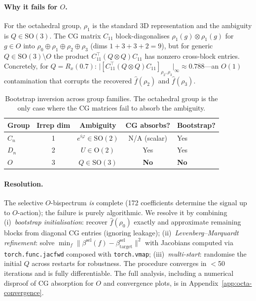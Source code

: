 \documentclass{article}
\newcommand{\SO}{\mathrm{SO}}
\newcommand{\OG}{\mathrm{O}}
\newcommand{\abs}[1]{\lvert #1 \rvert}
\newcommand{\norm}[1]{\lVert #1 \rVert}
\begin{document}
\paragraph{Why it fails for $O$.}
For the octahedral group, $\rho_1$ is the standard 3D representation
and the ambiguity is $Q \in \SO(3)$. The CG matrix $C_{11}$
block-diagonalises $\rho_1(g) \otimes \rho_1(g)$ for $g \in O$ into
$\rho_0 \oplus \rho_1 \oplus \rho_2 \oplus \rho_3$ (dims $1 + 3 + 3 + 2 = 9$),
but for generic $Q \in \SO(3) \setminus O$ the product
$C_{11}^\top (Q \otimes Q) C_{11}$ has nonzero cross-block entries.
Concretely, for $Q = R_x(0.7)$:
$\abs{[C_{11}^\top (Q \otimes Q) C_{11}]_{\rho_2, \rho_3}}_\infty
\approx 0.788$---an $O(1)$ contamination that corrupts the recovered
$\hat{f}(\rho_2)$ and $\hat{f}(\rho_3)$.

\begin{table}[h]
  \caption{Bootstrap inversion across group families. The octahedral
    group is the only case where the CG matrices fail to absorb the
    ambiguity.}
  \label{tab:bootstrap-comparison}
  \centering
  \small
  \begin{tabular}{lcccl}
    \toprule
    Group & Irrep dim & Ambiguity & CG absorbs? & Bootstrap? \\
    \midrule
    $C_n$ & 1 & $e^{i\varphi} \in \SO(2)$ & N/A (scalar) & Yes \\
    $D_n$ & 2 & $U \in \OG(2)$ & Yes & Yes \\
    $O$   & 3 & $Q \in \SO(3)$ & \textbf{No} & \textbf{No} \\
    \bottomrule
  \end{tabular}
\end{table}

\paragraph{Resolution.}
The selective $O$-bispectrum \emph{is} complete (172 coefficients
determine the signal up to $O$-action); the failure is purely
algorithmic. We resolve it by combining
(i)~\emph{bootstrap initialisation}: recover $\hat{f}(\rho_0)$
exactly and approximate remaining blocks from diagonal CG entries
(ignoring leakage);
(ii)~\emph{Levenberg--Marquardt refinement}: solve
$\min_f \norm{\beta^{\mathrm{sel}}(f)
  - \beta^{\mathrm{sel}}_{\mathrm{target}}}^2$
with Jacobians computed via \texttt{torch.func.jacfwd} composed with
\texttt{torch.vmap};
(iii)~\emph{multi-start}: randomise the initial $Q$ across restarts
for robustness. The procedure converges in $<$50 iterations and is
fully differentiable. The full analysis, including a numerical
disproof of CG absorption for $O$ and convergence plots, is in
Appendix~\ref{app:octa-convergence}.
\end{document}
